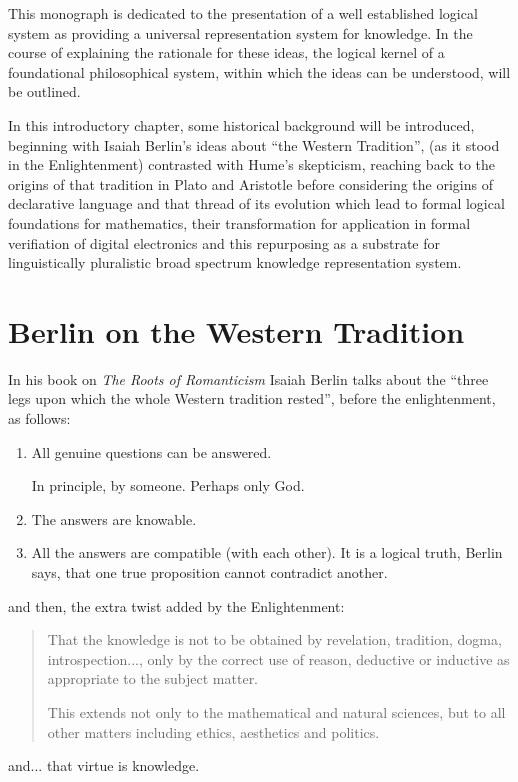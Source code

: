 This monograph is dedicated to the presentation of a well established logical system as providing a universal representation system for knowledge.
In the course of explaining the rationale for these ideas, the logical kernel of a foundational philosophical system, within which the ideas can be understood, will be outlined.

In this introductory chapter, some historical background will be introduced, beginning with Isaiah Berlin's ideas about ``the Western Tradition'', (as it stood in the Enlightenment) contrasted with Hume's skepticism, reaching back to the origins of that tradition in Plato and Aristotle before considering the origins of declarative language and that thread of its evolution which lead to formal logical foundations for mathematics, their transformation for application in formal verifiation of digital electronics and this repurposing as a substrate for linguistically pluralistic broad spectrum knowledge representation system.

\section{Berlin on the Western Tradition}

In his book on \emph{The Roots of Romanticism}\cite{berlinRR} Isaiah Berlin talks about the  ``three legs upon which the whole Western tradition rested'', before the enlightenment, as follows:
\begin{enumerate}
  \item All genuine questions can be answered.

    In principle, by someone.  Perhaps only God.
\item  The answers are knowable.
\item All the answers are compatible (with each other).
  It is a logical truth, Berlin says, that one true proposition cannot contradict another.
\end{enumerate}

and then, the extra twist added by the Enlightenment:
\begin{quotation}
That the knowledge is not to be obtained by revelation, tradition, dogma, introspection..., only by the correct use of reason, deductive or inductive as appropriate to the subject matter.

This extends not only to the mathematical and natural sciences, but to all other matters including ethics, aesthetics and politics.
\end{quotation}
and... that virtue is knowledge.

